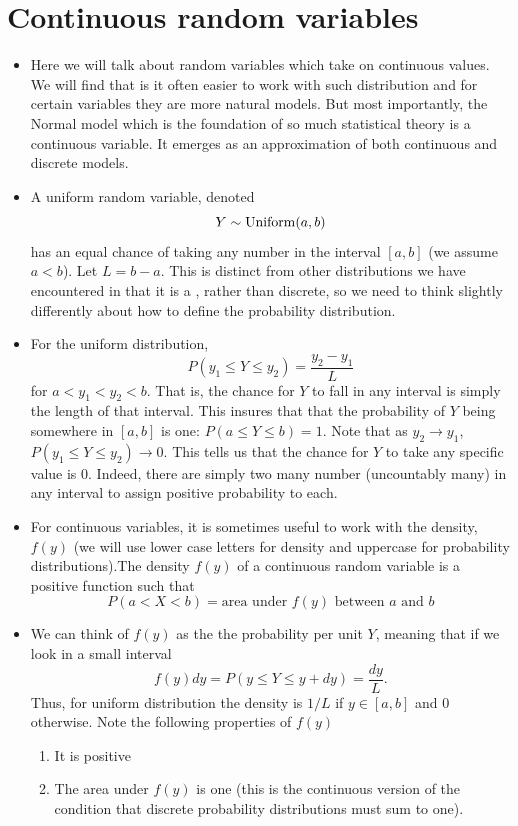  
 
 \section{Continuous random variables}
 \begin{itemize}
 \item Here we will talk about random variables which take on continuous values. We will find that is it often easier to work with such distribution and for certain variables they are more natural models. But most importantly, the Normal model which is the foundation of so much statistical theory is a continuous variable. It emerges as an approximation of both continuous and discrete models. 
 \item  A uniform random variable, denoted  
 \begin{equation*}
 Y \sim {\rm Uniform}(a,b)
 \end{equation*}
 has an equal chance of taking any number in the interval $[a,b]$ (we assume $a<b$). Let $L=b-a$. This is distinct from other distributions we have encountered in that it is a , rather than discrete, so we need to think slightly differently about how to define the probability distribution.
 \item For the uniform distribution, 
 \begin{equation*}
 P(y_1\le Y \le y_2) = \frac{y_2-y_1}{L}
 \end{equation*}
 for $a<y_1<y_2<b$. 
 That is, the chance for $Y$ to fall in any interval is simply the length of that interval. This insures that that the probability of $Y$ being somewhere in $[a,b]$ is one: $P(a\le Y\le b) = 1$. Note that as $y_2 \to y_1$, $P(y_1\le Y \le y_2) \to 0$. This tells us that the chance for $Y$ to take any specific value is $0$. Indeed, there are simply two many number (uncountably many) in any interval to assign positive probability to each.
 
 \item  For continuous variables, it is sometimes useful to work with the density, $f(y)$ (we will use lower case letters for density and uppercase for probability distributions).The density $f(y)$ of a continuous random variable is a positive function such that 
\begin{equation*}
P(a<X<b) = \text{area under $f(y)$ between $a$ and $b$}
\end{equation*}

\item We can think of $f(y)$ as the the probability per unit $Y$, meaning that if we look in a small interval 
 \begin{equation*}
f(y)dy = P(y \le Y \le y+dy) = \frac{dy}{L}.
 \end{equation*}
 Thus, for uniform distribution the density is $1/L$ if $y \in [a,b]$ and $0$ otherwise.  Note the following properties of $f(y)$
 \begin{enumerate}
 \item It is positive
 \item The area under $f(y)$ is one (this is the continuous version of the condition that discrete probability distributions must sum to one). 
 \end{enumerate}



\end{itemize}
